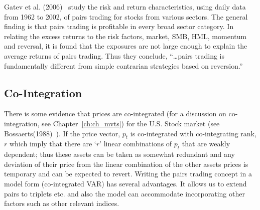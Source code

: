 \noindent{} \twomedskip


Gatev et al. (2006)~\cite{ggr} study the risk and return characteristics, using daily data from 1962 to 2002, of pairs trading for stocks from various sectors. The general finding is that pairs trading is profitable in every broad sector category. In relating the excess returns to the risk factors, market, SMB, HML, momentum and reversal, it is found that the exposures are not large enough to explain the average returns of pairs trading. Thus they conclude, ``\dots pairs trading is fundamentally different from simple contrarian strategies based on reversion.''



\subsection{Co-Integration}


There is some evidence that prices are co-integrated (for a discussion on co-integration, see Chapter~\ref{ch:ch_mvts}) for the U.S. Stock market (see Bossaerts(1988)~\cite{bossaerts1988common}). If the price vector, $p_t$ is co-integrated with co-integrating rank, $r$ which imply that there are `$r$' linear combinations of $p_t$ that are weakly dependent; thus these assets can be taken as somewhat redundant and any deviation of their price from the linear combination of the other assets prices is temporary and can be expected to revert. Writing the pairs trading concept in a model form (co-integrated VAR) has several advantages. It allows us to extend pairs to triplets etc. and also the model can accommodate incorporating other factors such as other relevant indices.


